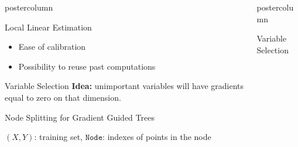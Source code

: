 \documentclass[dvipsnames]{beamer}
\newlength{\columnheight}
\begin{document}
\begin{frame}
\begin{columns}
\begin{column}{.5\textwidth}
\begin{beamercolorbox}[center]{postercolumn}
\begin{minipage}{.98\textwidth}
{\begin{myblock}{Local Linear Estimation}
\begin{itemize}
                                \item Ease of calibration
                                \item Possibility to reuse past computations
                            \end{itemize}
                    \end{myblock}
                    \begin{myblock}{Variable Selection}
                        \textbf{Idea:} unimportant variables will have gradients equal to zero on that dimension.
                        \begin{algorithm}[H]
                            \caption{Node Splitting for Gradient Guided Trees}\label{alg:LocalLinearTree}
                            \begin{algorithmic}[1] %
                                \Require $(X, Y)$: training set, $\texttt{Node}$: indexes of points in the node
                            \end{algorithmic}
                        \end{algorithm}
                    \end{myblock}\vfill
            }\end{minipage}\end{beamercolorbox}
    \end{column}
	\begin{column}{.5\textwidth}
		\begin{beamercolorbox}[center]{postercolumn}
			\begin{minipage}{.98\textwidth} %
				\parbox[t][\columnheight]{\textwidth}{ %
                    \begin{myblock}{Variable Selection}
                        \begin{table}[H]

\end{table}
\end{myblock}}
\end{minipage}
\end{beamercolorbox}
\end{column}
\end{columns}
\end{frame}
\end{document}
